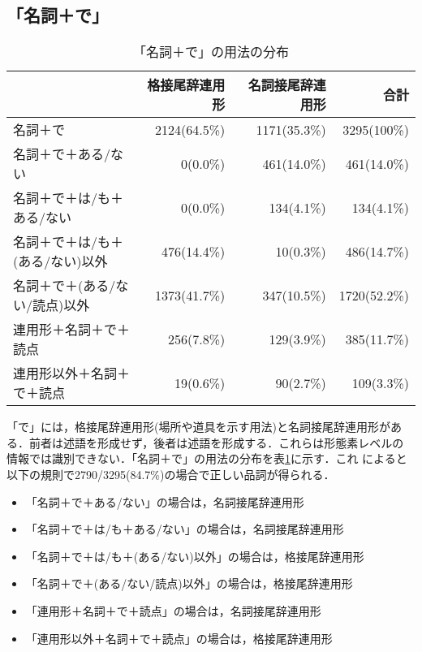 \subsection{「名詞＋で」}
\begin{table}
\begin{center}
\begin{tabular}{|l|r|r|r|} \hline
& 格接尾辞連用形 & 名詞接尾辞連用形 & 合計 \\ \hline
名詞＋で                         & 2124(64.5\%) & 1171(35.3\%) & 3295(100\%) \\
名詞＋で＋ある/ない              & 0(0.0\%) & 461(14.0\%) & 461(14.0\%) \\
名詞＋で＋は/も＋ある/ない       & 0(0.0\%) & 134(4.1\%) & 134(4.1\%) \\
名詞＋で＋は/も＋(ある/ない)以外 & 476(14.4\%) & 10(0.3\%) & 486(14.7\%) \\
名詞＋で＋(ある/ない/読点)以外   & 1373(41.7\%) & 347(10.5\%) & 1720(52.2\%) \\
連用形＋名詞＋で＋読点           & 256(7.8\%) & 129(3.9\%) & 385(11.7\%) \\
連用形以外＋名詞＋で＋読点       & 19(0.6\%) & 90(2.7\%) & 109(3.3\%) \\ \hline
\end{tabular}
\end{center}
\caption{「名詞＋で」の用法の分布}
\label{de}
\end{table}

「で」には，格接尾辞連用形(場所や道具を示す用法)と名詞接尾辞連用形があ
る．前者は述語を形成せず，後者は述語を形成する．これらは形態素レベルの
情報では識別できない．「名詞＋で」の用法の分布を表\ref{de}に示す．これ
によると以下の規則で2790/3295(84.7\%)の場合で正しい品詞が得られる．
\begin{itemize}
\item 「名詞＋で＋ある/ない」の場合は，名詞接尾辞連用形
\item 「名詞＋で＋は/も＋ある/ない」の場合は，名詞接尾辞連用形
\item 「名詞＋で＋は/も＋(ある/ない)以外」の場合は，格接尾辞連用形
\item 「名詞＋で＋(ある/ない/読点)以外」の場合は，格接尾辞連用形
\item 「連用形＋名詞＋で＋読点」の場合は，名詞接尾辞連用形
\item 「連用形以外＋名詞＋で＋読点」の場合は，格接尾辞連用形
\end{itemize}

